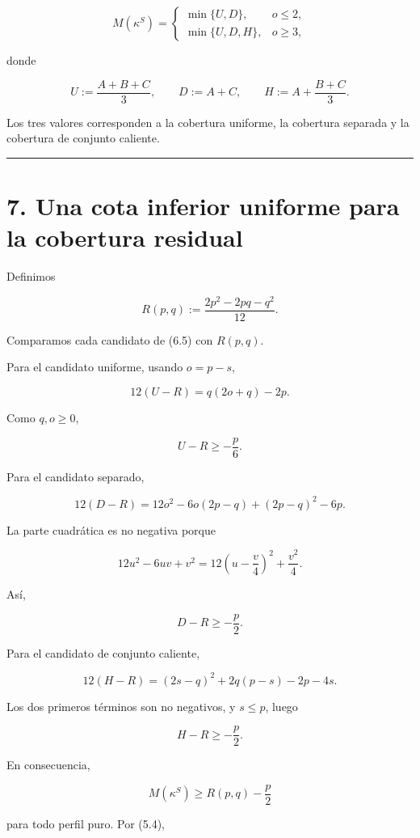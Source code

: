 \documentclass[
  11pt,
]{article}
\begin{document}
\[
M(\kappa^S)
=
\begin{cases}
\min\{U,D\},&o\le2,\\[1mm]
\min\{U,D,H\},&o\ge3,
\end{cases}
\tag{6.5}
\]

donde

\[
U:=\frac{A+B+C}{3},
\qquad
D:=A+C,
\qquad
H:=A+\frac{B+C}{3}.
\tag{6.6}
\]

Los tres valores corresponden a la cobertura uniforme, la cobertura
separada y la cobertura de conjunto caliente.

\begin{center}\rule{0.5\linewidth}{0.5pt}\end{center}

\section{7. Una cota inferior uniforme para la cobertura
residual}\label{una-cota-inferior-uniforme-para-la-cobertura-residual}

Definimos

\[
R(p,q)
:=
\frac{2p^2-2pq-q^2}{12}.
\tag{7.1}
\]

Comparamos cada candidato de (6.5) con \(R(p,q)\).

Para el candidato uniforme, usando \(o=p-s\),

\[
12(U-R)
=
q(2o+q)-2p.
\tag{7.2}
\]

Como \(q,o\ge0\),

\[
U-R\ge-\frac p6.
\tag{7.3}
\]

Para el candidato separado,

\[
12(D-R)
=
12o^2-6o(2p-q)+(2p-q)^2-6p.
\tag{7.4}
\]

La parte cuadrática es no negativa porque

\[
12u^2-6uv+v^2
=
12\left(u-\frac v4\right)^2+\frac{v^2}{4}.
\]

Así,

\[
D-R\ge-\frac p2.
\tag{7.5}
\]

Para el candidato de conjunto caliente,

\[
12(H-R)
=
(2s-q)^2+2q(p-s)-2p-4s.
\tag{7.6}
\]

Los dos primeros términos son no negativos, y \(s\le p\), luego

\[
H-R\ge-\frac p2.
\tag{7.7}
\]

En consecuencia,

\[
M(\kappa^S)
\ge
R(p,q)-\frac p2
\]

para todo perfil puro. Por (5.4),
\end{document}
